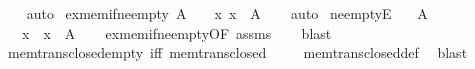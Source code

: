 \begin{isabellebody}
%
\isadelimproof
\ \ %
\endisadelimproof
%
\isatagproof
{}\isamarkupfalse%
\ auto%
\endisatagproof
{\isafoldproof}%
%
\isadelimproof
\isanewline
%
\endisadelimproof
\isanewline
{}\isamarkupfalse%
\ ex{\isacharunderscore}{\kern0pt}mem{\isacharunderscore}{\kern0pt}if{\isacharunderscore}{\kern0pt}ne{\isacharunderscore}{\kern0pt}empty{\isacharcolon}{\kern0pt}\ {\isachardoublequoteopen}A\ {\isasymnoteq}\ {\isacharbraceleft}{\kern0pt}{\isacharbraceright}{\kern0pt}\ {\isasymLongrightarrow}\ {\isasymexists}x{\isachardot}{\kern0pt}\ x\ {\isasymin}\ A{\isachardoublequoteclose}\isanewline
%
\isadelimproof
\ \ %
\endisadelimproof
%
\isatagproof
{}\isamarkupfalse%
\ auto%
\endisatagproof
{\isafoldproof}%
%
\isadelimproof
\isanewline
%
\endisadelimproof
\isanewline
{}\isamarkupfalse%
\ ne{\isacharunderscore}{\kern0pt}emptyE{\isacharcolon}{\kern0pt}\isanewline
\ \ \ {\isachardoublequoteopen}A\ {\isasymnoteq}\ {\isacharbraceleft}{\kern0pt}{\isacharbraceright}{\kern0pt}{\isachardoublequoteclose}\isanewline
\ \ \ x\ \ {\isachardoublequoteopen}x\ {\isasymin}\ A{\isachardoublequoteclose}\isanewline
%
\isadelimproof
\ \ %
\endisadelimproof
%
\isatagproof
{}\isamarkupfalse%
\ ex{\isacharunderscore}{\kern0pt}mem{\isacharunderscore}{\kern0pt}if{\isacharunderscore}{\kern0pt}ne{\isacharunderscore}{\kern0pt}empty{\isacharbrackleft}{\kern0pt}OF\ assms{\isacharbrackright}{\kern0pt}\isanewline
\ \ \isamarkupfalse%
\ blast%
\endisatagproof
{\isafoldproof}%
%
\isadelimproof
\isanewline
%
\endisadelimproof
\isanewline
{}\isamarkupfalse%
\ mem{\isacharunderscore}{\kern0pt}trans{\isacharunderscore}{\kern0pt}closed{\isacharunderscore}{\kern0pt}empty\ {\isacharbrackleft}{\kern0pt}iff{\isacharbrackright}{\kern0pt}{\isacharcolon}{\kern0pt}\ {\isachardoublequoteopen}mem{\isacharunderscore}{\kern0pt}trans{\isacharunderscore}{\kern0pt}closed\ {\isacharbraceleft}{\kern0pt}{\isacharbraceright}{\kern0pt}{\isachardoublequoteclose}\isanewline
%
\isadelimproof
\ \ %
\endisadelimproof
%
\isatagproof
{}\isamarkupfalse%
\ mem{\isacharunderscore}{\kern0pt}trans{\isacharunderscore}{\kern0pt}closed{\isacharunderscore}{\kern0pt}def\ \isamarkupfalse%
\ blast%
\endisatagproof
{\isafoldproof}%
%
\isadelimproof
\isanewline
%
\endisadelimproof
\isanewline
%
\isadelimtheory
\isanewline
%
\endisadelimtheory
%
\isatagtheory
{}\isamarkupfalse%
%
\endisatagtheory
{\isafoldtheory}%
%
\isadelimtheory
%
\endisadelimtheory
%
\end{isabellebody}%
